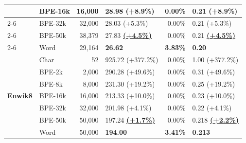 \begin{table}[h]
{\begin{tabular}{|l|l|r|l|r|l|}
 & BPE-16k & 16,000 & 28.98 (+8.9\%) & 0.00\% & 0.21 (+8.9\%) \\ \cline{2-6}
 & BPE-32k & 32,000 & 28.03 (+5.3\%) & 0.00\% & 0.21 (+5.3\%) \\ \cline{2-6}
 & BPE-50k & 38,379 & 27.83 \underline{\textbf{(+4.5\%)}} & 0.00\% & 0.21 \underline{\textbf{(+4.5\%)}} \\ \cline{2-6}
 & Word & 29,164 & \textbf{26.62} & \textbf{3.83\%} & \textbf{0.20} \\ \hline \hline
\multirow{7}{*}{\textbf{Enwik8}} & Char & 52 & 925.72 (+377.2\%) & 0.00\% & 1.00 (+377.2\%) \\ \cline{2-6}
 & BPE-2k & 2,000 & 290.28 (+49.6\%) & 0.00\% & 0.31 (+49.6\%) \\ \cline{2-6}
 & BPE-8k & 8,000 & 231.30 (+19.2\%) & 0.00\% & 0.25 (+19.2\%) \\ \cline{2-6}
 & BPE-16k & 16,000 & 213.33 (+10.0\%) & 0.00\% & 0.23 (+10.0\%) \\ \cline{2-6}
 & BPE-32k & 32,000 & 201.98 (+4.1\%) & 0.00\% & 0.22 (+4.1\%) \\ \cline{2-6}
 & BPE-50k & 50,000 & 197.24 \underline{\textbf{(+1.7\%)}} & 0.00\% & 0.218 \underline{\textbf{(+2.2\%)}} \\ \cline{2-6}
 & Word & 50,000 & \textbf{194.00} & \textbf{3.41\%} & \textbf{0.213} \\ \hline
\end{tabular}
}
\end{table}
